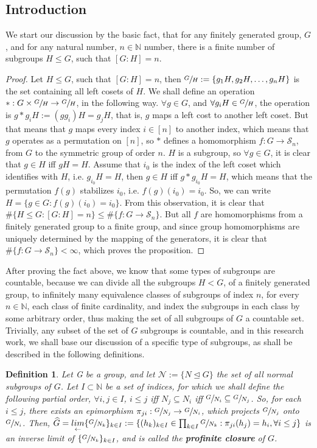 \documentclass[12pt]{article}
\newtheorem{definition}[theorem]{Definition}
\begin{document}
\subsection{Introduction}
We start our discussion by the basic fact, that for any finitely generated group, $G$, and for any natural number, $n\in\mathbb{N}$ number, there is a finite number of subgroups $H\leq G$, such that $[G:H]=n$.
\begin{proof}
Let $H\leq G$, such that $[G:H]=n$, then $\sfrac{G}{H}:=\{g_1H,g_2H,\dots,g_nH\}$ is the set containing all left cosets of $H$. We shall define an operation $*:G\times\sfrac{G}{H}\rightarrow \sfrac{G}{H}$, in the following way. $\forall g\in G$, and $\forall g_iH\in\sfrac{G}{H}$, the operation is $g*g_iH:=(gg_i)H=g_jH$, that is, $g$ maps a left cost to another left coset. But that means that $g$ maps every index $i\in [n]$ to another index, which means that $g$ operates as a permutation on $[n]$, so $*$ defines a homomorphism $f:G\rightarrow\mathcal{S}_n$, from $G$ to the symmetric group of order $n$. $H$ is a subgroup, so $\forall g\in G$, it is clear that $g\in H$ iff $gH=H$. Assume that $i_0$  is the index of the left coset which identifies with $H$, i.e. $g_{i_0}H=H$, then $g\in H$ iff $g*g_{i_0}H=H$, which means that the permutation $f(g)$ stabilizes $i_0$, i.e. $f(g)(i_0)=i_0$. So, we can write $H=\{g\in G : f(g)(i_0)=i_0\}$. From this observation, it is clear that $\#\{H\leq G : [G:H]=n\}\leq\#\{f:G\rightarrow \mathcal{S}_n\}$. But all $f$ are homomorphisms from a finitely generated group to a finite group, and since group homomorphisms are uniquely determined by the mapping of the generators, it is clear that $\#\{f:G\rightarrow \mathcal{S}_n\}<\infty$, which proves the proposition.
\end{proof}
After proving the fact above, we know that some types of subgroups are countable, because we can divide all the subgroups $H<G$, of a finitely generated group, to infinitely many equivalence classes of subgroups of index $n$, for every $n\in\mathbb{N}$, each class of finite cardinality, and index the subgroups in each class by some arbitrary order, thus making the set of all subgroups of $G$ a countable set.
Trivially, any subset of the set of $G$ subgroups is countable, and in this research work, we shall base our discussion of a specific type of subgroups, as shall be described in the following definitions. 
\begin{definition}
\label{def:inverse.limit}
Let G be a group, and let $\mathcal{N}:=\{N\trianglelefteq G\}$ the set of all normal subgroups of $G$. Let $I\subset\mathbb{N}$ be a set of indices, for which we shall define the following partial order, $\forall i,j\in I$, $i\leq j$ iff $N_j\subseteq N_i$ iff $\sfrac{G}{N_i}\subseteq\sfrac{G}{N_j}$. So, for each $i\leq j$, there exists an epimorphism $\pi_{ji}:\sfrac{G}{N_
j}\rightarrow\sfrac{G}{N_i}$, which projects $\sfrac{G}{N_
j}$ onto $\sfrac{G}{N_
i}$. Then, $\widehat{G}=\underset{\leftarrow}{lim}\{\sfrac{G}{N_k}\}_{k\in I}:=\{(h_k)_{k\in I}\in\prod_{k\in I}\sfrac{G}{N_k} : \pi_{ji}(h_j)=h_i,\forall i\leq j\}$ is an inverse limit of $\{\sfrac{G}{N_k}\}_{k\in I}$, and is called the \textbf{profinite closure} of $G$.
\end{definition}
\end{document}
